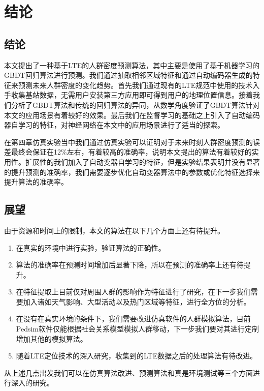 \chapter{结论}
\label{chap:conclusion}

\section{结论}

本文提出了一种基于LTE的人群密度预测算法，其中主要是使用了基于机器学习的GBDT回归算法进行预测。我们通过抽取相邻区域特征和通过自动编码器生成的特征来预测未来人群密度的变化趋势。首先我们通过现有的LTE规范中使用的技术入手收集基站数据，无需用户安装第三方应用即可得到用户的地理位置信息。接着我们分析了GBDT算法和传统的回归算法的异同，从数学角度验证了GBDT算法针对本文的应用场景有着较好的效果。最后我们在监督学习的基础之上引入了自动编码器自学习的特征，对神经网络在本文中的应用场景进行了适当的探索。

在第四章仿真实验当中我们通过仿真实验可以证明对于未来时刻人群密度预测的误差最终会保证在12\%左右，有着较高的准确率，说明本文提出的算法有着较好的实用性。扩展性的我们加入了自动变器自学习的特征，但是实验结果表明并没有显著的提升预测的准确率，我们需要逐步优化自动变器算法中的参数或优化特征选择来提升算法的准确率。

\section{展望}

由于资源和时间上的限制，本文的算法在以下几个方面上还有待提升。

\begin{enumerate}
    \item 在真实的环境中进行实验，验证算法的正确性。
    \item 算法的准确率在预测时间增加后显著下降，所以在预测的准确率上还有待提升。
    \item 在特征提取上目前仅对周围人群的影响作为特征进行了研究，在下一步我们需要加入诸如天气影响、大型活动以及热门区域等特征，进行全方位的分析。
    \item 在没有在真实环境的条件下，我们需要改进仿真软件的人群模拟算法，目前Pedsim软件仅能根据社会关系模型模拟人群移动，下一步我们要对其进行定制增加其他的模拟算法。
    \item 随着LTE定位技术的深入研究，收集到的LTE数据之后的处理算法有待改进。
\end{enumerate}

从上述几点出发我们可以在仿真算法改进、预测算法和真是环境测试等三个方面进行深入的研究。